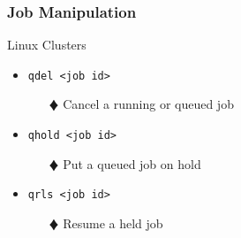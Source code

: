 \documentclass[slidestop,mathserif,compress,xcolor=svgnames,table]{beamer}
\newenvironment{bblock}[0]
{
\begin{beamerboxesrounded}[upper=uppercol1,lower=lowercol1,shadow=true]}
{\end{beamerboxesrounded}}
\begin{document}
\begin{frame}
  \frametitle{\small Job Manipulation}
  \begin{bblock}{Linux Clusters}
    \begin{itemize}
      \item \texttt{qdel <job id>}
      \begin{enumerate}
	\item[$\vardiamond$] Cancel a running or queued job
      \end{enumerate}
      \item \texttt{qhold <job id>}
      \begin{enumerate}
	\item[$\vardiamond$] Put a queued job on hold
      \end{enumerate}
      \item \texttt{qrls <job id>}
      \begin{enumerate}
	\item[$\vardiamond$] Resume a held job
      \end{enumerate}
    \end{itemize}
  \end{bblock}

\end{frame}
\end{document}
